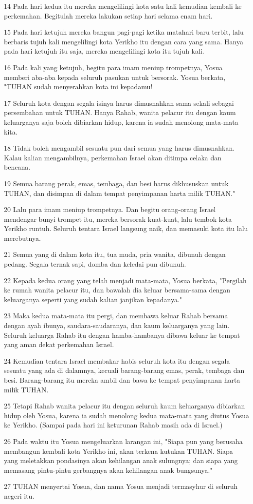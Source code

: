 \par 14 Pada hari kedua itu mereka mengelilingi kota satu kali kemudian kembali ke perkemahan. Begitulah mereka lakukan setiap hari selama enam hari.
\par 15 Pada hari ketujuh mereka bangun pagi-pagi ketika matahari baru terbit, lalu berbaris tujuh kali mengelilingi kota Yerikho itu dengan cara yang sama. Hanya pada hari ketujuh itu saja, mereka mengelilingi kota itu tujuh kali.
\par 16 Pada kali yang ketujuh, begitu para imam meniup trompetnya, Yosua memberi aba-aba kepada seluruh pasukan untuk bersorak. Yosua berkata, "TUHAN sudah menyerahkan kota ini kepadamu!
\par 17 Seluruh kota dengan segala isinya harus dimusnahkan sama sekali sebagai persembahan untuk TUHAN. Hanya Rahab, wanita pelacur itu dengan kaum keluarganya saja boleh dibiarkan hidup, karena ia sudah menolong mata-mata kita.
\par 18 Tidak boleh mengambil sesuatu pun dari semua yang harus dimusnahkan. Kalau kalian mengambilnya, perkemahan Israel akan ditimpa celaka dan bencana.
\par 19 Semua barang perak, emas, tembaga, dan besi harus dikhususkan untuk TUHAN, dan disimpan di dalam tempat penyimpanan harta milik TUHAN."
\par 20 Lalu para imam meniup trompetnya. Dan begitu orang-orang Israel mendengar bunyi trompet itu, mereka bersorak kuat-kuat, lalu tembok kota Yerikho runtuh. Seluruh tentara Israel langsung naik, dan memasuki kota itu lalu merebutnya.
\par 21 Semua yang di dalam kota itu, tua muda, pria wanita, dibunuh dengan pedang. Segala ternak sapi, domba dan keledai pun dibunuh.
\par 22 Kepada kedua orang yang telah menjadi mata-mata, Yosua berkata, "Pergilah ke rumah wanita pelacur itu, dan bawalah dia keluar bersama-sama dengan keluarganya seperti yang sudah kalian janjikan kepadanya."
\par 23 Maka kedua mata-mata itu pergi, dan membawa keluar Rahab bersama dengan ayah ibunya, saudara-saudaranya, dan kaum keluarganya yang lain. Seluruh keluarga Rahab itu dengan hamba-hambanya dibawa keluar ke tempat yang aman dekat perkemahan Israel.
\par 24 Kemudian tentara Israel membakar habis seluruh kota itu dengan segala sesuatu yang ada di dalamnya, kecuali barang-barang emas, perak, tembaga dan besi. Barang-barang itu mereka ambil dan bawa ke tempat penyimpanan harta milik TUHAN.
\par 25 Tetapi Rahab wanita pelacur itu dengan seluruh kaum keluarganya dibiarkan hidup oleh Yosua, karena ia sudah menolong kedua mata-mata yang diutus Yosua ke Yerikho. (Sampai pada hari ini keturunan Rahab masih ada di Israel.)
\par 26 Pada waktu itu Yosua mengeluarkan larangan ini, "Siapa pun yang berusaha membangun kembali kota Yerikho ini, akan terkena kutukan TUHAN. Siapa yang meletakkan pondasinya akan kehilangan anak sulungnya; dan siapa yang memasang pintu-pintu gerbangnya akan kehilangan anak bungsunya."
\par 27 TUHAN menyertai Yosua, dan nama Yosua menjadi termasyhur di seluruh negeri itu.

